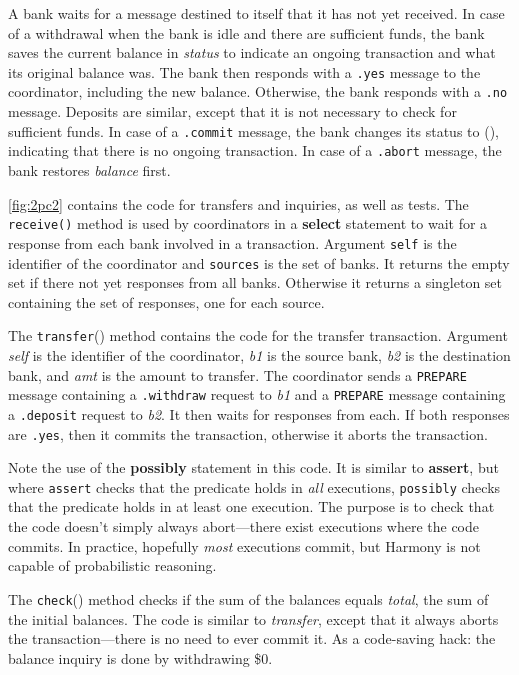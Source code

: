 \documentclass{report}
\begin{document}
\noindent
A bank waits for a message destined to itself that it has not yet received.
In case of a withdrawal when the bank is idle and there are sufficient
funds, the bank saves the current balance in \textit{status} to indicate
an ongoing transaction and what its original balance was.
The bank then responds with a \texttt{.yes} message to the coordinator,
including the new balance.
Otherwise, the bank responds with a \texttt{.no} message.
Deposits are similar, except that it is not necessary to check for
sufficient funds.
In case of a \texttt{.commit} message, the bank changes its status
to (), indicating that there is no ongoing transaction.  In case of
a \texttt{.abort} message, the bank restores \textit{balance} first.

\autoref{fig:2pc2} contains the code for transfers and inquiries, as well
as tests.
The \texttt{receive()} method is used by coordinators in a \textbf{select}
statement to wait for a response from each bank involved in a transaction.
Argument \texttt{self} is the
identifier of the coordinator and \texttt{sources} is the set of banks.
It returns the empty set if there not yet responses from all banks.
Otherwise it returns a singleton set containing the set of responses,
one for each source.

The \texttt{transfer}() method contains the code for the transfer
transaction.  Argument \textit{self} is the identifier of the coordinator,
\textit{b1} is the source bank, \textit{b2} is the destination bank,
and \textit{amt} is the amount to transfer.
The coordinator sends a \texttt{PREPARE} message containing a
\texttt{.withdraw} request to \textit{b1} and a \texttt{PREPARE}
message containing a \texttt{.deposit} request to \textit{b2}.
It then waits for responses from each.  If both responses are
\texttt{.yes}, then it commits the transaction, otherwise it aborts
the transaction.

Note the use of the \textbf{possibly} statement in this code.
It is similar to \textbf{assert}, but where \texttt{assert} checks that
the predicate holds in \emph{all} executions, \texttt{possibly} checks
that the predicate holds in at least one execution.
The purpose is to check that the code doesn't simply always abort---there
exist executions where the code commits.
In practice, hopefully \emph{most} executions commit, but Harmony is not
capable of probabilistic reasoning.

The \texttt{check}() method checks if the sum of the balances equals
\textit{total}, the sum of the initial balances.
The code is similar to \textit{transfer}, except that it always
aborts the transaction---there is no need to ever commit it.
As a code-saving hack: the balance inquiry is done by withdrawing \$0.
\end{document}
